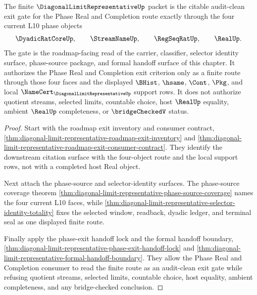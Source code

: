 \begin{theorem}
\label{thm:diagonal-limit-representative-audit-clean-exit-gate}
The finite $\DiagonalLimitRepresentativeUp$ packet is the citable audit-clean exit gate for the Phase Real and Completion route exactly through the four current L10 phase objects
$$
\DyadicRatCoreUp,\qquad \StreamNameUp,\qquad \RegSeqRatUp,\qquad \RealUp.
$$
The gate is the roadmap-facing read of the carrier, classifier, selector identity surface, phase-source package, and formal handoff surface of this chapter. It authorizes the Phase Real and Completion exit criterion only as a finite route through those four faces and the displayed $\BHist$, $\hsame$, $\Cont$, $\Pkg$, and local $\NameCert_{\DiagonalLimitRepresentativeUp}$ support rows. It does not authorize quotient streams, selected limits, countable choice, host $\RealUp$ equality, ambient $\RealUp$ completeness, or $\bridgeCheckedV$ status.
\end{theorem}
\begin{proof}
Start with the roadmap exit inventory and consumer contract, \autoref{thm:diagonal-limit-representative-roadmap-exit-inventory} and \autoref{thm:diagonal-limit-representative-roadmap-exit-consumer-contract}. They identify the downstream citation surface with the four-object route and the local support rows, not with a completed host Real object.

Next attach the phase-source and selector-identity surfaces. The phase-source coverage theorem \autoref{thm:diagonal-limit-representative-phase-source-coverage} names the four current L10 faces, while \autoref{thm:diagonal-limit-representative-selector-identity-totality} fixes the selected window, readback, dyadic ledger, and terminal seal as one displayed finite route.

Finally apply the phase-exit handoff lock and the formal handoff boundary, \autoref{thm:diagonal-limit-representative-phase-exit-handoff-lock} and \autoref{thm:diagonal-limit-representative-formal-handoff-boundary}. They allow the Phase Real and Completion consumer to read the finite route as an audit-clean exit gate while refusing quotient streams, selected limits, countable choice, host equality, ambient completeness, and any bridge-checked conclusion.
\end{proof}

